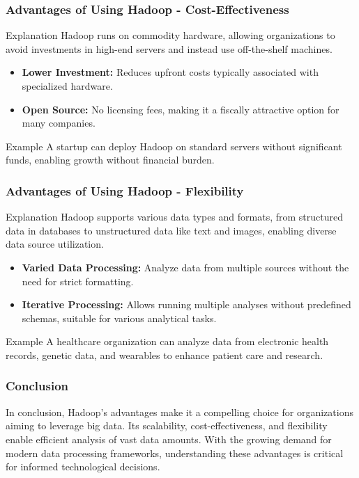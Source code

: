 \documentclass[aspectratio=169]{beamer}
\begin{document}
\begin{frame}[fragile]
    \frametitle{Advantages of Using Hadoop - Cost-Effectiveness}
    \begin{block}{Explanation}
        Hadoop runs on commodity hardware, allowing organizations to avoid investments in high-end servers and instead use off-the-shelf machines.
    \end{block}
    
    \begin{itemize}
        \item \textbf{Lower Investment:} Reduces upfront costs typically associated with specialized hardware.
        \item \textbf{Open Source:} No licensing fees, making it a fiscally attractive option for many companies.
    \end{itemize}
    
    \begin{block}{Example}
        A startup can deploy Hadoop on standard servers without significant funds, enabling growth without financial burden.
    \end{block}
\end{frame}

\begin{frame}[fragile]
    \frametitle{Advantages of Using Hadoop - Flexibility}
    \begin{block}{Explanation}
        Hadoop supports various data types and formats, from structured data in databases to unstructured data like text and images, enabling diverse data source utilization.
    \end{block}
    
    \begin{itemize}
        \item \textbf{Varied Data Processing:} Analyze data from multiple sources without the need for strict formatting.
        \item \textbf{Iterative Processing:} Allows running multiple analyses without predefined schemas, suitable for various analytical tasks.
    \end{itemize}
    
    \begin{block}{Example}
        A healthcare organization can analyze data from electronic health records, genetic data, and wearables to enhance patient care and research.
    \end{block}
\end{frame}

\begin{frame}[fragile]
    \frametitle{Conclusion}
    In conclusion, Hadoop’s advantages make it a compelling choice for organizations aiming to leverage big data. Its scalability, cost-effectiveness, and flexibility enable efficient analysis of vast data amounts. With the growing demand for modern data processing frameworks, understanding these advantages is critical for informed technological decisions.
\end{frame}
\end{document}
